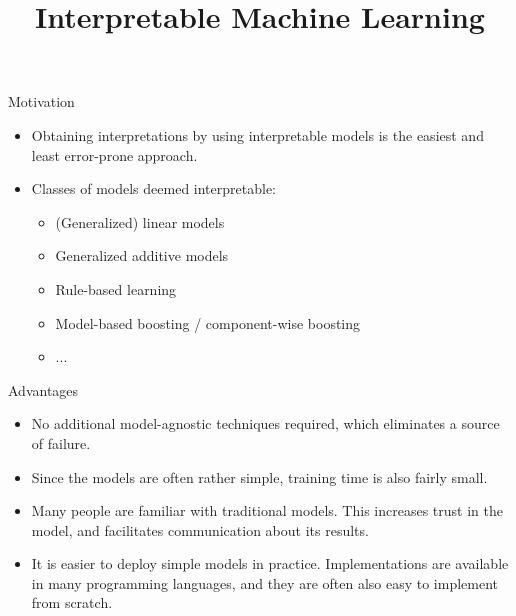 \documentclass[11pt,compress,t,notes=noshow, xcolor=table]{beamer}
\title{Interpretable Machine Learning}
\institute{\href{https://compstat-lmu.github.io/lecture_iml/}{compstat-lmu.github.io/lecture\_iml}}
\date{}
\begin{document}


\newcommand{\titlefigure}{figure/whitebox}
\newcommand{\learninggoals}{
\item What characteristics does an interpretable model have?
\item Why should we use interpretable models at all?
\item Examples for interpretable models.}





\begin{vbframe}{Motivation}

    \begin{itemize}
        \item Obtaining interpretations by using interpretable models is the easiest and least error-prone approach.
        \bigskip
        \item Classes of models deemed interpretable:
        \begin{itemize}
            \item (Generalized) linear models
            \item Generalized additive models
            \item Rule-based learning
            \item Model-based boosting / component-wise boosting
            \item ...
        \end{itemize}
    \end{itemize}	
	
\end{vbframe}
	
\begin{vbframe}{Advantages}

    \begin{itemize}
    \itemsep2em
        \item No additional model-agnostic techniques required, which eliminates a source of failure.
        \item Since the models are often rather simple, training time is also fairly small.
        \item Many people are familiar with traditional models. This increases trust in the model, and facilitates communication about its results.
        \item It is easier to deploy simple models in practice. Implementations are available in many programming languages, and they are often also easy to implement from scratch.
    \end{itemize}	
	
\end{vbframe}
\end{document}
